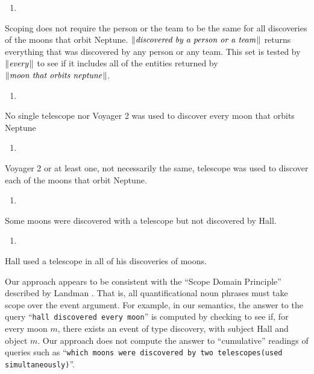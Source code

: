 \documentclass[../main.tex]{subfiles}
\begin{document}
\begin{refsection}
\begin{enumerate}[before=\small, label=\alph*.]
	\setlength\itemsep{0em}
	\setcounter{enumi}{2}
	\item {}
\end{enumerate}
\noindent Scoping does not require the person or the team to be the same for all discoveries of the moons that
orbit Neptune. $\lVert\textit{discovered by a person or a team\hspace{0.1em}}\rVert$ returns everything that was discovered by any
person or any team. This set is tested by $\lVert\textit{every\hspace{0.1em}}\rVert$ to see if it includes all of the entities returned by
$\lVert\textit{moon that orbits neptune\hspace{0.1em}}\rVert$.
\begin{enumerate}[before=\small, label=\alph*.]
	\setlength\itemsep{0em}
	\setcounter{enumi}{3}
	\item {}
\end{enumerate}
\noindent No single telescope nor Voyager 2 was used to discover every moon that orbits Neptune
\begin{enumerate}[before=\small, label=\alph*.]
	\setlength\itemsep{0em}
	\setcounter{enumi}{4}
	\item {}
\end{enumerate}
\noindent Voyager 2 or at least one, not necessarily the same, telescope was used to discover each of the moons
that orbit Neptune.
\begin{enumerate}[before=\small, label=\alph*.]
	\setlength\itemsep{0em}
	\setcounter{enumi}{5}
	\item {}
\end{enumerate}
\noindent  Some moons were discovered with a telescope but not discovered by Hall.
\begin{enumerate}[before=\small, label=\alph*.]
	\setlength\itemsep{0em}
	\setcounter{enumi}{6}
	\item {}
\end{enumerate}
\noindent Hall used a telescope in all of his discoveries of moons.

Our approach appears to be consistent with the ``Scope Domain Principle'' described by Landman \cite{landman1996plurality}. That is, all
quantificational noun phrases must take scope over the event argument. For example, in our semantics,
the answer to the query ``\texttt{hall discovered every moon}'' is computed by checking to see if, for every moon
$m$, there exists an event of type discovery, with subject Hall and object $m$. Our approach does not
compute the answer to ``cumulative'' readings of queries such as ``\texttt{which moons were discovered by two
telescopes(used simultaneously)}''.


\end{refsection}
\end{document}
